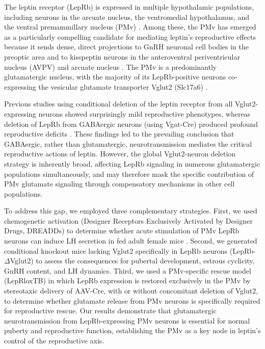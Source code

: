 \documentclass[12pt]{article}
\begin{document}
The leptin receptor (LepRb) is expressed in multiple hypothalamic populations, including neurons in the arcuate nucleus, the ventromedial hypothalamus, and the ventral premammillary nucleus (PMv) \citep{leshan2009leptin}. Among these, the PMv has emerged as a particularly compelling candidate for mediating leptin's reproductive effects because it sends dense, direct projections to GnRH neuronal cell bodies in the preoptic area and to kisspeptin neurons in the anteroventral periventricular nucleus (AVPV) and arcuate nucleus \citep{donato2013pmv}. The PMv is a predominantly glutamatergic nucleus, with the majority of its LepRb-positive neurons co-expressing the vesicular glutamate transporter Vglut2 (Slc17a6) \citep{donato2011ventral}.

Previous studies using conditional deletion of the leptin receptor from all Vglut2-expressing neurons showed surprisingly mild reproductive phenotypes, whereas deletion of LepRb from GABAergic neurons (using Vgat-Cre) produced profound reproductive deficits \citep{zuure2013leptin, vong2011leptin}. These findings led to the prevailing conclusion that GABAergic, rather than glutamatergic, neurotransmission mediates the critical reproductive actions of leptin. However, the global Vglut2-neuron deletion strategy is inherently broad, affecting LepRb signaling in numerous glutamatergic populations simultaneously, and may therefore mask the specific contribution of PMv glutamate signaling through compensatory mechanisms in other cell populations.

To address this gap, we employed three complementary strategies. First, we used chemogenetic activation (Designer Receptors Exclusively Activated by Designer Drugs, DREADDs) to determine whether acute stimulation of PMv LepRb neurons can induce LH secretion in fed adult female mice \citep{roth2016dreadds}. Second, we generated conditional knockout mice lacking Vglut2 specifically in LepRb neurons (LepRb-$\Delta$Vglut2) to assess the consequences for pubertal development, estrous cyclicity, GnRH content, and LH dynamics. Third, we used a PMv-specific rescue model (LepRloxTB) in which LepRb expression is restored exclusively in the PMv by stereotaxic delivery of AAV-Cre, with or without concomitant deletion of Vglut2, to determine whether glutamate release from PMv neurons is specifically required for reproductive rescue. Our results demonstrate that glutamatergic neurotransmission from LepRb-expressing PMv neurons is essential for normal puberty and reproductive function, establishing the PMv as a key node in leptin's control of the reproductive axis.
\end{document}
